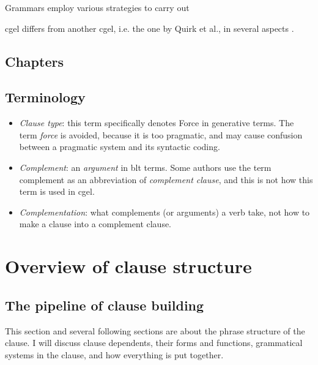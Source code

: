 \documentclass{article}
\newcommand*{\term}[1]{\emph{#1}}
\begin{document}
Grammars employ various strategies to carry out %

\ac{cgel} differs from another \ac{cgel}, i.e. the one by Quirk et al., in several aspects \citep{leech2004}.

\subsection{Chapters}

\subsection{Terminology}

\begin{itemize}
    \item \term{Clause type}: this term specifically denotes Force in generative terms.
    The term \term{force} is avoided, 
    because it is too pragmatic,
    and may cause confusion between a pragmatic system and its syntactic coding.
    \item \term{Complement}: an \term{argument} in \ac{blt} terms. 
    Some authors use the term complement as an abbreviation of \term{complement clause},
    and this is not how this term is used in \ac{cgel}.
    \item \term{Complementation}: what complements (or arguments) a verb take, 
    not how to make a clause into a complement clause.
\end{itemize}

\section{Overview of clause structure}

\subsection{The pipeline of clause building}\label{sec:pipeline}

This section and several following sections are about the phrase structure of the clause.
I will discuss clause dependents, 
their forms and functions,
grammatical systems in the clause,
and how everything is put together.
\end{document}
